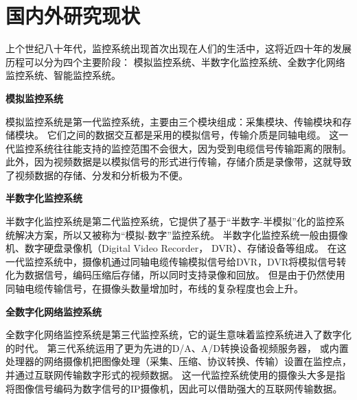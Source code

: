 

\section{国内外研究现状}
上个世纪八十年代，监控系统出现首次出现在人们的生活中，这将近四十年的发展历程可以分为四个主要阶段：
模拟监控系统、半数字化监控系统、全数字化网络监控系统、智能监控系统\cite{李炎2019基于}。

\noindent \textbf{模拟监控系统}

模拟监控系统是第一代监控系统，主要由三个模块组成：采集模块、传输模块和存储模块\cite{薄建彬0基于}。
它们之间的数据交互都是采用的模拟信号，传输介质是同轴电缆。
这一代监控系统往往能支持的监控范围不会很大，因为受到电缆信号传输距离的限制。
此外，因为视频数据是以模拟信号的形式进行传输，存储介质是录像带，这就导致了视频数据的存储、分发和分析极为不便。

\noindent \textbf{半数字化监控系统}

半数字化监控系统是第二代监控系统，它提供了基于“半数字-半模拟”化的监控系统解决方案，所以又被称为“模拟-数字”监控系统。
半数字化监控系统一般由摄像机、数字硬盘录像机（Digital Video Recorder， DVR）、存储设备等组成\cite{视频监控系统工程实用技术}。
在这一代监控系统中，摄像机通过同轴电缆传输模拟信号给DVR，DVR将模拟信号转化为数据信号，编码压缩后存储，所以同时支持录像和回放。
但是由于仍然使用同轴电缆传输信号，在摄像头数量增加时，布线的复杂程度也会上升。

\noindent \textbf{全数字化网络监控系统}

全数字化网络监控系统是第三代监控系统，它的诞生意味着监控系统进入了数字化的时代。
第三代系统运用了更为先进的D/A、A/D转换设备视频服务器，
或内置处理器的网络摄像机把图像处理（采集、压缩、协议转换、传输）设置在监控点\cite{浅谈监控系统的重要性和发展历史}，
并通过互联网传输数字形式的视频数据。
这一代监控系统使用的摄像头大多是指将图像信号编码为数字信号的IP摄像机，因此可以借助强大的互联网传输数据。

